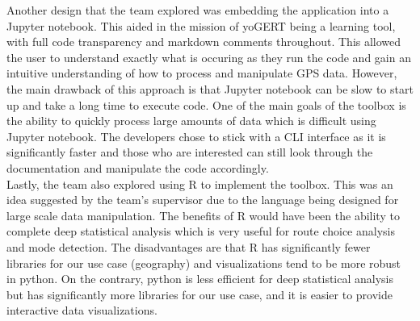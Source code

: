 \documentclass[12pt, titlepage]{article}
\begin{document}
\noindent Another design that the team explored was embedding the application into a Jupyter notebook. This aided in the mission of yoGERT being a learning tool, with full code transparency and markdown comments throughout. This allowed the user to understand exactly what is occuring as they run the code and gain an intuitive understanding of how to process and manipulate GPS data. However, the main drawback of this approach is that Jupyter notebook can be slow to start up and take a long time to execute code. One of the main goals of the toolbox is the ability to quickly process large amounts of data which is difficult using Jupyter notebook. The developers chose to stick with a CLI interface as it is significantly faster and those who are interested can still look through the documentation and manipulate the code accordingly. \\

\noindent Lastly, the team also explored using R to implement the toolbox. This was an idea suggested by the team's supervisor due to the language being designed for large scale data manipulation. The benefits of R would have been the ability to complete deep statistical analysis which is very useful for route choice analysis and mode detection. The disadvantages are that R has significantly fewer libraries for our use case (geography) and visualizations tend to be more robust in python. On the contrary, python is less efficient for deep statistical analysis but has significantly more libraries for our use case, and it is easier to provide interactive data visualizations. \\
\end{document}
